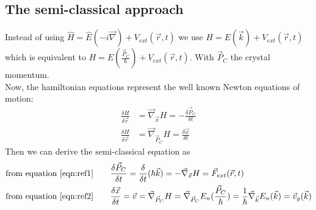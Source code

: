 \subsection{The semi-classical approach}
Instead of using $\hat{H} = \hat{E}(-i\vec{\nabla}) + V_{ext}(\vec{r}, t)$ we use $H =  E(\vec{k}) + V_{ext}(\vec{r}, t)$ which is equivalent to $H =  E(\frac{\vec{P}_C}{\hbar}) + V_{ext}(\vec{r}, t)$. With $\vec{P}_C$ the crystal momentum. \\
Now, the hamiltonian equations represent the well known Newton equations of motion:
\begin{align}
	\frac{\delta H}{\delta \vec{r}} &= \vec{\nabla}_{\vec{x}}H = -\frac{\delta\vec{P}_C}{\delta t} \label{eqn:ref1}\\
	\frac{\delta H}{\delta \vec{r}} &= \vec{\nabla}_{\vec{P}_C}H = \frac{\delta\vec{x}}{\delta t} \label{eqn:ref2}
\end{align}
Then we can derive the semi-classical equation as
\begin{align}
	\text{from equation \ref{eqn:ref1}} &\qquad \frac{\delta \vec{P}_C}{\delta t} = \frac{\delta}{\delta t}(\hbar\vec{k}) = -\vec{\nabla}_{\vec{x}}H = \vec{F}_{ext}(\vec{r}, t) \\*
	\text{from equation \ref{eqn:ref2}} &\qquad \frac{\delta \vec{x}}{\delta t} = \vec{v} = \vec{\nabla}_{\vec{P}_C}H = \vec{\nabla}_{\vec{P}_C}E_n(\frac{\vec{P}_C}{\hbar}) = \frac{1}{\hbar}\vec{\nabla}_{\vec{k}}E_n(\vec{k}) = \vec{v}_g(\vec{k})
\end{align}

